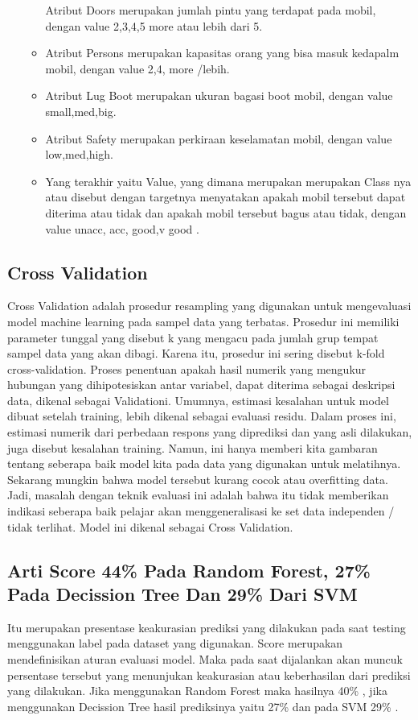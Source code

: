 \begin{enumerate}
\begin{itemize}
Atribut Doors merupakan jumlah pintu yang terdapat pada mobil, dengan value 2,3,4,5 more atau lebih dari 5.
\item
Atribut Persons merupakan kapasitas orang yang bisa masuk kedapalm mobil, dengan value 2,4, more /lebih.
\item
Atribut Lug Boot merupakan ukuran bagasi boot mobil, dengan value small,med,big.
\item
Atribut Safety merupakan perkiraan keselamatan mobil, dengan value low,med,high.
\item
Yang terakhir yaitu Value, yang dimana merupakan merupakan Class nya atau disebut dengan targetnya menyatakan apakah mobil tersebut dapat diterima atau tidak dan apakah mobil tersebut bagus atau tidak, dengan value unacc, acc, good,v good .
\end{itemize}
\end{enumerate}

\subsection{Cross Validation}
Cross Validation adalah prosedur resampling yang digunakan untuk mengevaluasi model machine learning pada sampel data yang terbatas. Prosedur ini memiliki parameter tunggal yang disebut k yang mengacu pada jumlah grup tempat sampel data yang akan dibagi. Karena itu, prosedur ini sering disebut k-fold cross-validation.
Proses penentuan apakah hasil numerik yang mengukur hubungan yang dihipotesiskan antar variabel, dapat diterima sebagai deskripsi data, dikenal sebagai Validationi. Umumnya, estimasi kesalahan untuk model dibuat setelah training, lebih dikenal sebagai evaluasi residu. Dalam proses ini, estimasi numerik dari perbedaan respons yang diprediksi dan yang asli dilakukan, juga disebut kesalahan training. Namun, ini hanya memberi kita gambaran tentang seberapa baik model kita pada data yang digunakan untuk melatihnya. Sekarang mungkin bahwa model tersebut kurang cocok atau overfitting data. Jadi, masalah dengan teknik evaluasi ini adalah bahwa itu tidak memberikan indikasi seberapa baik pelajar akan menggeneralisasi ke set data independen / tidak terlihat. Model ini dikenal sebagai Cross Validation.

\subsection{Arti Score 44\% Pada Random Forest, 27\% Pada Decission Tree Dan 29\% Dari SVM}
Itu merupakan presentase keakurasian prediksi yang dilakukan pada saat testing menggunakan label pada dataset yang digunakan. Score merupakan mendefinisikan aturan evaluasi model. Maka pada saat dijalankan akan muncuk persentase tersebut yang menunjukan keakurasian atau keberhasilan dari prediksi yang dilakukan. Jika menggunakan Random Forest maka hasilnya 40\% , jika menggunakan Decission Tree hasil prediksinya yaitu 27\% dan pada SVM 29\% .

